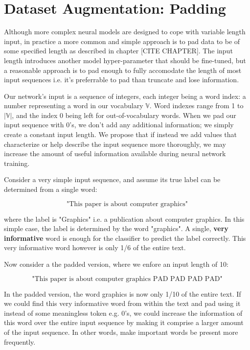 \section{Dataset Augmentation: Padding}

Although more complex neural models are designed to cope with variable length input,
in practice a more common and simple approach is to pad data to be of some specified
length as described in chapter [CITE CHAPTER]. The input length introduces another model hyper-parameter
that should be fine-tuned, but a reasonable approach is to pad enough to fully accomodate
the length of most input sequences i.e. it’s preferrable to pad than truncate and lose
information.

Our network's input is a sequence of integers, each integer being a word index: a number representing a word in our vocabulary $\mathbb{V}$.
Word indexes range from 1 to $|\mathbb{V}|$, and the index 0 being left for out-of-vocabulary words.
When we pad our input sequence with 0’s, we don’t add any additional information; we
simply create a constant input length. We propose that if instead we add values that characterize or help
describe the input sequence more thoroughly, we may increase the amount of useful information
available during neural network training.

Consider a very simple input sequence, and assume its true label can be determined
from a single word:

\[\text{"This paper is about computer graphics"}\]

where the label is "Graphics" i.e. a publication about computer graphics.
In this simple case, the label is determined by the word "graphics". A single, \textbf{very
informative} word is enough for the classifier to predict the label correctly. This very
informative word however is only 1/6 of the entire text.

Now consider a the padded version, where we enfore an input length of 10:

\[\text{"This paper is about computer graphics PAD PAD PAD PAD"}\]

In the padded version, the word graphics is now only 1/10 of the entire text. If we
could find this very informative word from within the text and pad using it instead of some
meaningless token e.g. 0's, we could increase the information of this word over the entire
input sequence by making it comprise a larger amount of the input sequence. In other
words, make important words be present more frequently.

